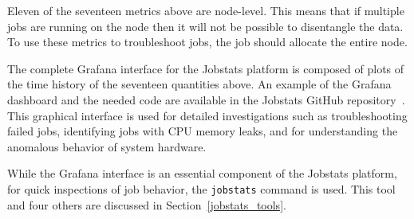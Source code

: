 Eleven of the seventeen metrics above are node-level. This means that if multiple jobs are running on the node then it will not be possible to disentangle the data. To use these metrics to troubleshoot jobs, the job should allocate the entire node.

The complete Grafana interface for the Jobstats platform is composed of plots of the time history of the seventeen quantities above. An example of the Grafana dashboard and the needed code are available in the Jobstats GitHub repository~\cite{jobstats_repo}. This graphical interface is used for detailed investigations such as troubleshooting failed jobs, identifying jobs with CPU memory leaks, and for understanding the anomalous behavior of system hardware.

While the Grafana interface is an essential component of the Jobstats platform, for quick inspections of job behavior, the \texttt{jobstats} command is used. This tool and four others are discussed in Section~\ref{jobstats_tools}.
